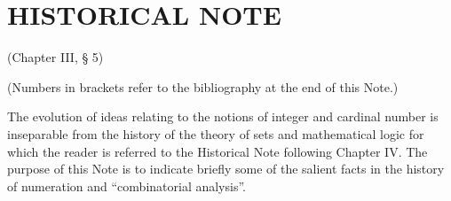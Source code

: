 \section*{HISTORICAL NOTE}
{}

(Chapter III, § 5)

(Numbers in brackets refer to the bibliography at the end of this Note.)

The evolution of ideas relating to the notions of integer and cardinal number is inseparable from the history of the theory of sets and mathematical logic for which the reader is referred to the Historical Note following Chapter IV. The purpose of this Note is to indicate briefly some of the salient facts in the history of numeration and ``combinatorial analysis''.

